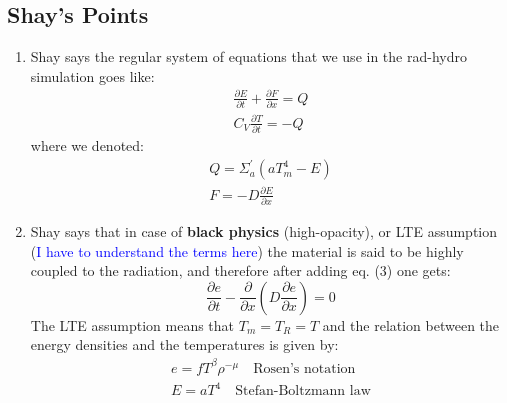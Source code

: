 \documentclass[11pt]{article}
\begin{document}
\subsection{Shay's Points}
    \begin{enumerate}
        \item Shay says the regular system of equations that we use in the rad-hydro simulation goes like:
        \begin{equation}
            \begin{aligned}
                \frac{\partial E}{\partial t} + \frac{\partial F}{\partial x} = Q \\
                C_V \frac{\partial T}{\partial t} = -Q
            \end{aligned}
        \end{equation}
        where we denoted:
        \begin{equation}
            \begin{aligned}
                Q = \Sigma_a^\prime (aT_m^4 - E) \\
                F = -D \frac{\partial E}{\partial x}
            \end{aligned}
        \end{equation}

        \item Shay says that in case of \textbf{black physics} (high-opacity), or LTE assumption (\textcolor{blue}{I have to understand the terms here}) the material is said to be highly coupled to the radiation, and therefore after adding eq. (3) one gets:
        \begin{equation}
            \frac{\partial e}{\partial t} - \frac{\partial}{\partial x}\left(D \frac{\partial e}{\partial x}\right) = 0
        \end{equation}
        The LTE assumption means that $T_m = T_R = T$ and the relation between the energy densities and the temperatures is given by:
        \begin{equation}
            \begin{aligned}
                e = f T^\beta \rho^{-\mu} \quad \text{Rosen's notation} \\
                E = a T^4 \quad \text{Stefan-Boltzmann law}
            \end{aligned}
        \end{equation}


\end{enumerate}
\end{document}
